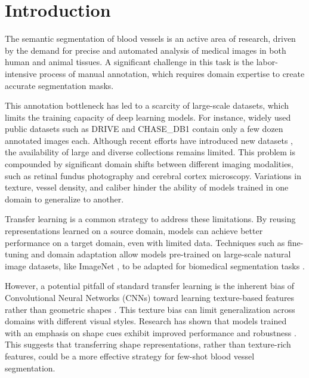 \documentclass[%
reprint,
nofootinbib,
 amsmath,amssymb,
aps,
superscriptaddress,
showkeys,
longbibliography
]{revtex4-1}
\begin{document}

\maketitle
\thispagestyle{plain}

\section{Introduction}
\label{sec:introduction}

The semantic segmentation of blood vessels is an active area of research, driven by the demand for precise and automated analysis of medical images in both human and animal tissues. A significant challenge in this task is the labor-intensive process of manual annotation, which requires domain expertise to create accurate segmentation masks.

This annotation bottleneck has led to a scarcity of large-scale datasets, which limits the training capacity of deep learning models. For instance, widely used public datasets such as DRIVE \cite{Staal2004} and CHASE\_DB1 \cite{Fraz2012ensemble} contain only a few dozen annotated images each. Although recent efforts have introduced new datasets \cite{jin2022fives, fhima2024lunet}, the availability of large and diverse collections remains limited. This problem is compounded by significant domain shifts between different imaging modalities, such as retinal fundus photography and cerebral cortex microscopy. Variations in texture, vessel density, and caliber hinder the ability of models trained in one domain to generalize to another.

Transfer learning is a common strategy to address these limitations. By reusing representations learned on a source domain, models can achieve better performance on a target domain, even with limited data. Techniques such as fine-tuning and domain adaptation allow models pre-trained on large-scale natural image datasets, like ImageNet \cite{JiaDeng2009}, to be adapted for biomedical segmentation tasks \cite{zoetmulderDomainTaskspecificTransfer2022}.

However, a potential pitfall of standard transfer learning is the inherent bias of Convolutional Neural Networks (CNNs) toward learning texture-based features rather than geometric shapes \cite{geirhos2018, islam2021shape}. This texture bias can limit generalization across domains with different visual styles. Research has shown that models trained with an emphasis on shape cues exhibit improved performance and robustness \cite{geirhos2018}. This suggests that transferring shape representations, rather than texture-rich features, could be a more effective strategy for few-shot blood vessel segmentation.
\end{document}
